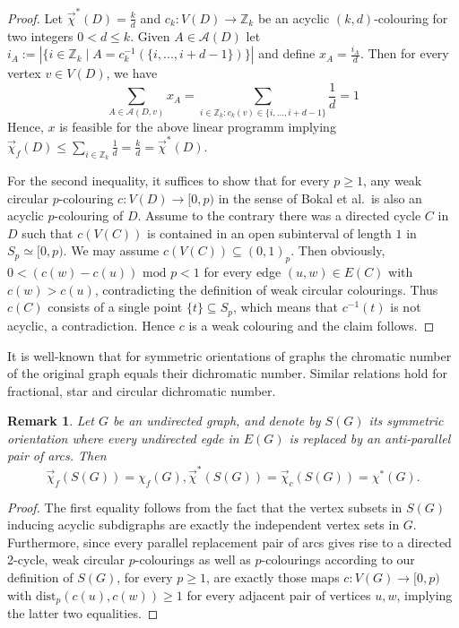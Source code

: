 \documentclass[fontsize=11pt,a4paper,DIV12]{scrartcl}
\theoremstyle{meiner}
\newtheorem{remark}{Remark}
\theoremstyle{definition}
\begin{document}
\begin{proof}
  Let $\vec{\chi}^\ast(D)=\frac{k}{d}$ and $c_k:V(D) \rightarrow
  \mathbb{Z}_k$ be an acyclic $(k,d)$-colouring for two integers $0<d\le
  k$. Given $A \in \mathcal{A}(D)$ let $i_A :=|\{i \in \mathbb{Z}_k
  \mid A= c_k^{-1}(\{i,...,i+d-1\})\}|$ and define
  $x_A=\frac{i_A}{d}$.  Then for every vertex $v \in V(D)$, we have
$$\sum_{A \in \mathcal{A}(D,v)}{x_A}=\sum_{i \in \mathbb{Z}_k:c_k(v) \in \{i,...,i+d-1\}}{\frac{1}{d}}=1$$
Hence, $x$ is feasible for the above linear programm implying
$\vec{\chi}_f(D)\le \sum_{i \in
  \mathbb{Z}_k}{\frac{1}{d}}=\frac{k}{d}= \vec{\chi}^\ast(D)$. 

For the second inequality, it suffices to show that for every $p \ge
1$, any weak circular $p$-colouring $c:V(D) \rightarrow [0,p)$ in the
sense of Bokal et al.\ is also an acyclic $p$-colouring of $D$.
Assume to the contrary there was a directed cycle $C$ in $D$ such
that $c(V(C))$ is contained in an open subinterval of length $1$ in
$S_p \simeq [0,p)$. We may assume $c(V(C)) \subseteq (0,1)_p$. Then
obviously, $0<(c(w)-c(u)) \text{ mod }p <1$ for every edge $(u,w) \in
E(C)$ with $c(w)>c(u)$, contradicting the definition of weak circular
colourings.  Thus $c(C)$ consists of a single point $\{t\} \subseteq
S_p$, which means that $c^{-1}(t)$ is not acyclic, a contradiction. Hence $c$ is a weak colouring
and the claim follows.
\end{proof}
It is well-known that for symmetric orientations of graphs  the chromatic number of the original graph equals their dichromatic number. Similar relations hold for fractional, star and circular dichromatic number.
\begin{remark}\label{remark:symmetric}
Let $G$ be an undirected graph, and denote by $S(G)$ its symmetric orientation where every undirected egde in $E(G)$ is replaced by an anti-parallel pair of arcs. Then 
$$\vec{\chi}_f(S(G))=\chi_f(G), \vec{\chi}^\ast(S(G))=\vec{\chi}_c(S(G))=\chi^\ast(G).$$
\end{remark}
\begin{proof}
  The first equality follows from the fact that the vertex subsets in
  $S(G)$ inducing acyclic subdigraphs are exactly the independent
  vertex sets in $G$. Furthermore, since every parallel replacement
  pair of arcs gives rise to a directed 2-cycle, weak circular
  $p$-colourings as well as $p$-colourings according to our definition
  of $S(G)$, for every $p \ge 1$, are exactly those maps $c:V(G)
  \rightarrow [0,p)$ with $\text{dist}_p(c(u),c(w)) \ge 1$ for every
  adjacent pair of vertices $u,w$, implying the latter
  two equalities.
\end{proof}
\end{document}
